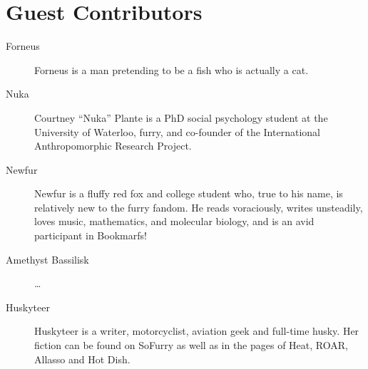 \section*{Guest Contributors}

\begin{description}
  \item[Forneus] Forneus is a man pretending to be a fish who is actually a cat.
  \item[Nuka] Courtney “Nuka” Plante is a PhD social psychology student at the University of Waterloo, furry, and co-founder of the International Anthropomorphic Research Project.
  \item[Newfur] Newfur is a fluffy red fox and college student who, true to his name, is relatively new to the furry fandom. He reads voraciously, writes unsteadily, loves music, mathematics, and molecular biology, and is an avid participant in Bookmarfs!
  \item[Amethyst Bassilisk] \ldots
  \item[Huskyteer] Huskyteer is a writer, motorcyclist, aviation geek and full-time husky. Her fiction can be found on SoFurry as well as in the pages of Heat, ROAR, Allasso and Hot Dish.
\end{description}
